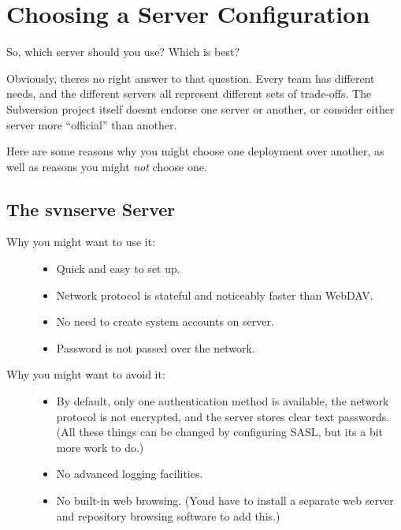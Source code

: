 \section{Choosing a Server
Configuration}\label{svn.serverconfig.choosing}

So, which server should you use? Which is best?

Obviously, there\textquotesingle s no right answer to that question.
Every team has different needs, and the different servers all represent
different sets of trade-offs. The Subversion project itself
doesn\textquotesingle t endorse one server or another, or consider
either server more ``official'' than another.

Here are some reasons why you might choose one deployment over another,
as well as reasons you might \emph{not} choose one.

\subsection{The svnserve
Server}\label{svn.serverconfig.choosing.svnserve}

\begin{description}
\item[Why you might want to use it:]
\hfill
\begin{itemize}
\item
  Quick and easy to set up.
\item
  Network protocol is stateful and noticeably faster than WebDAV.
\item
  No need to create system accounts on server.
\item
  Password is not passed over the network.
\end{itemize}
\item[Why you might want to avoid it:]
\hfill
\begin{itemize}
\item
  By default, only one authentication method is available, the network
  protocol is not encrypted, and the server stores clear text passwords.
  (All these things can be changed by configuring SASL, but
  it\textquotesingle s a bit more work to do.)
\item
  No advanced logging facilities.
\item
  No built-in web browsing. (You\textquotesingle d have to install a
  separate web server and repository browsing software to add this.)
\end{itemize}
\end{description}

